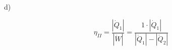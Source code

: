 d)

\[
\eta_{II} = \frac{| \dot{Q}_1 |}{| \dot{W} |} = \frac{1 \cdot | \dot{Q}_1 |}{| \dot{Q}_1 | - | \dot{Q}_2 |}
\]